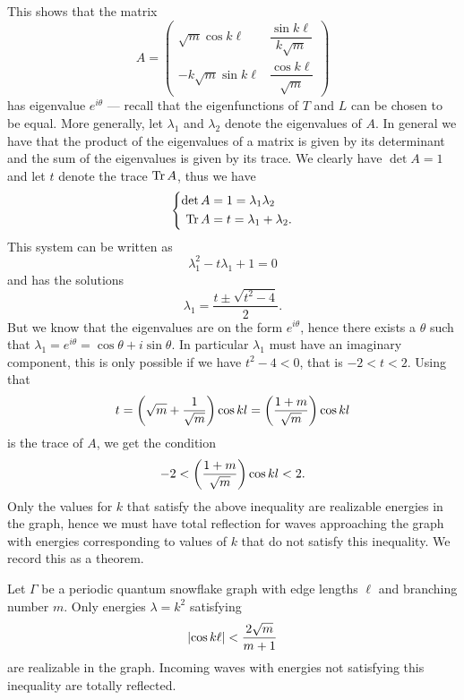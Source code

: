 This shows that the matrix
\[
  A =
  \begin{pmatrix}
    \sqrt{m}\cos k\ell & \dfrac{\sin k\ell}{k\sqrt{m}} \\
    -k\sqrt{m} \sin k\ell & \dfrac{\cos k\ell}{\sqrt{m}}
  \end{pmatrix}
\]
has eigenvalue $e^{i\theta}$ --- recall that the eigenfunctions of $T$ and $L$ can be chosen to be equal. More generally, let $\lambda_1$ and $\lambda_2$ denote the eigenvalues of $A$. In general we have that the product of the eigenvalues of a matrix is given by its determinant and the sum of the eigenvalues is given by its trace. We clearly have $\det A = 1$ and let $t$ denote the trace $\operatorname{Tr} A$, thus we have
\[
  \left\lbrace\begin{aligned}
    \det A &= 1 = \lambda_1 \lambda_2 \\
    \operatorname{Tr} A &= t = \lambda_1 + \lambda_2.
  \end{aligned}\right.
\]
This system can be written as
\[
  \lambda_1^2 - t\lambda_1 + 1 = 0
\]
and has the solutions
\[
  \lambda_1 = \frac{t\pm\sqrt{t^2-4}}{2}.
\]
But we know that the eigenvalues are on the form $e^{i\theta}$, hence there exists a $\theta$ such that $\lambda_1 = e^{i\theta} = \cos \theta + i \sin \theta$. In particular $\lambda_1$ must have an imaginary component, this is only possible if
we have $t^2-4 < 0$, that is $-2 < t < 2$. Using that
\[
  t = \left(\sqrt{m}+\frac{1}{\sqrt{m}}\right)\cos kl = \left(\frac{1+m}{\sqrt{m}}\right) \cos kl
\]
is the trace of $A$, we get the condition
\[
  -2 < \left(\frac{1+m}{\sqrt{m}}\right) \cos kl < 2.
\]
Only the values for $k$ that satisfy the above inequality are realizable energies in the graph, hence we must have total reflection for waves approaching the graph with energies corresponding to values of $k$ that do not satisfy this inequality. We record this as a theorem.

\begin{theorem}
  Let $\Gamma$ be a periodic quantum snowflake graph with edge lengths $\ell$ and branching number $m$. Only energies $\lambda = k^2$ satisfying
  \[
    \left\lvert\cos k\ell\right\rvert < \frac{2\sqrt{m}}{m+1}
  \]
  are realizable in the graph. Incoming waves with energies not satisfying this inequality are totally reflected.
\end{theorem}

